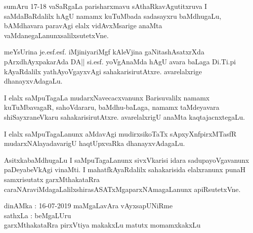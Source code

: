 sumAru 17-18 vaSaRgaLa parisharxmavu sAthaRkavAgutitxruva I saMdaBaRdalilx hAgU namamx kuTuMbada sadasayxru baMdhugaLu, bAMdhavara paravAgi elalx vidAvxMsarige anaMta vaMdanegaLanunx\break salilxsutetxVne. 

meYsUrina je.esf.esf. iMjiniyariMgf kAleVjina gaNita\-\break shAsatxrXda pArxdhAyxpakarAda DA|| si.esf. yoVgAnaMda hAgU avara baLaga Di.Ti.pi kAyaRdalilx yathAyoVgayxvAgi sahakarisirutAtxre. avarelalxrige dhanayxvAdagaLu. 

I elalx saMpuTagaLa mudarxNavecacxvanunx Barisuvalilx namamx kuTuMbavagaR, sahoVdararu, baMdhu-baLaga, namamx taMdeyavara shiSayxraneVkaru sahakarisirutAtxre. avarelalxrigU anaMta kaqtajacnxtegaLu. 

I elalx saMpuTagaLanunx aMdavAgi mudirxsikoTaTx sApxyXnf\break pirxMTasfR mudarxNAlayadavarigU haqtUpxvaRka dhanayxvAdagaLu.

AsitxkabaMdhugaLu I saMpuTagaLanunx sivxVkarisi idara sadupayoVgavanunx paDeyabeVkAgi vinaMti. I mahatfkAyaRdalilx sahakarisida elalxranunx punaH samxrisutatx garxMthakataRra caraNAraviMdagaLalilx\break shirasASATxMgaparxNAmagaLanunx apiRsutetxVne.

\bigskip

\noindent dinAMka : 16-07-2019 maMgaLavAra vAyxsapUNiRme\\
sathxLa : beMgaLUru\\
garxMthakataRra pirxVtiya makakxLu matutx momamxkakxLu
